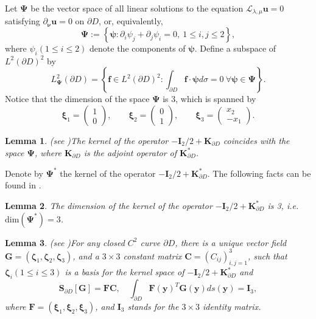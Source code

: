 \documentclass[10pt,reqno,oneside]{amsart}%
\newtheorem{lem}{Lemma}[section]
\theoremstyle{definition}
\theoremstyle{remark}
\numberwithin{equation}{section}
\numberwithin{equation}{section}
\begin{document}
Let $\mathbf{\Psi}$ be the vector space of all linear solutions to the equation $\mathcal{L}_{\lambda,\mu}\mathbf{u}=0$ satisfying $\partial_{\boldsymbol{\nu}}\mathbf{u}=0$ on $\partial D$, or, equivalently,
\[
\mathbf{\Psi}:=\left\{\boldsymbol{\psi}:\partial_i\psi_j+\partial_j\psi_i=0,\ 1\leq i,j\leq 2\right\},
\]
where $\psi_i\left(1\leq i\leq2\right)$ denote the components of $\boldsymbol{\psi}$. Define a subspace of $L^2(\partial D)^2$ by
$$
L_{\mathbf{\Psi}}^2(\partial D)=\left\{\boldsymbol{f} \in L^2(\partial D)^2: \int_{\partial D} \boldsymbol{f} \cdot \boldsymbol{\psi} d \sigma=0 ~\forall \boldsymbol{\psi} \in \mathbf{\Psi}\right\}.
$$
Notice that the dimension of the space $\mathbf{\Psi}$ is 3, which is spanned by \cite{Kangelasticity}
\begin{equation}\label{xi}
\boldsymbol{\xi}_1=
\left(\begin{array}{l}
1  \\
0
\end{array}\right),\quad\quad
\boldsymbol{\xi}_2=
\left(\begin{array}{l}
0 \\
1
\end{array}\right),\quad\quad
\boldsymbol{\xi}_3=
\left(\begin{array}{l}
x_{2} \\
-x_{1}
\end{array}\right).%
\end{equation}
\begin{lem}(see \cite{HAmmariElasticityImaging})\label{Xi}   %
The kernel of the operator $-\mathbf{I}_2 / 2+\mathbf{K}_{\partial D}$ coincides with the space $\mathbf{\Psi}$, where
$\mathbf{K}_{\partial D}$ is the adjoint operator of $\mathbf{K}_{\partial D}^{*}$.
\end{lem}
Denote by $\mathbf{\Psi}^*$
the kernel of the operator $-\mathbf{I}_2 / 2+\mathbf{K}_{\partial D}^*$. The following facts can be found in \cite{Duke1988}.
\begin{lem}
The dimension of the kernel of the operator $-\mathbf{I}_2 / 2+\mathbf{K}_{\partial D}^*$ is 3, i.e. $\text{dim}(\mathbf{\Psi}^*)=3$.
\end{lem}
\begin{lem}(see \cite{ChristianConstanda})\label{kernelspace}
For any closed $C^2$ curve $\partial D$, there is a unique vector field $\mathbf{G}=(\boldsymbol{\zeta}_1,\boldsymbol{\zeta}_2,\boldsymbol{\zeta}_3)$, and a $3\times 3$ constant matrix ${\mathbf{C}}=(C_{ij})_{i,j=1}^{3}$, such that $\boldsymbol{\zeta}_i(1\leq i\leq 3)$ is a basis for the kernel space of $-\mathbf{I}_2 / 2+\mathbf{K}_{\partial D}^{*}$ and
\begin{equation}
\mathbf{S}_{\partial D}[\mathbf{G}]=\mathbf{F}\mathbf{C},\quad \int_{\partial D}\mathbf{F}(\mathbf{y})^T\mathbf{G}(\mathbf{y})d s(\mathbf{y})={\mathbf{I}_3},\nonumber
\end{equation}
where $\mathbf{F}=(\boldsymbol{\xi}_1,\boldsymbol{\xi}_2,\boldsymbol{\xi}_3)$, and $\mathbf{I}_3$ stands for the $3\times3$ identity matrix.
\end{lem}
\end{document}
